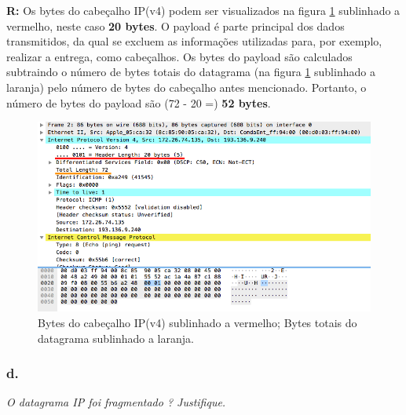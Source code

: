 \documentclass{llncs}
\begin{document}
\textbf{R:} Os bytes do cabeçalho IP(v4) podem ser visualizados na figura \ref{fig:2_c} sublinhado a vermelho, neste caso \textbf{20 bytes}. O payload é parte principal dos dados transmitidos, da qual se excluem as informações utilizadas para, por exemplo, realizar a entrega, como cabeçalhos. Os bytes do payload são calculados subtraindo o número de bytes totais do datagrama (na figura \ref{fig:2_c} sublinhado a laranja) pelo número de bytes do cabeçalho antes mencionado. Portanto, o número de bytes do payload são (72 - 20 =) \textbf{52 bytes}.

\begin{figure}[H]
\begin{center}
\includegraphics[scale=0.45]{2_c.png} 
\end{center}
\caption{\label{fig:2_c}Bytes do cabeçalho IP(v4) sublinhado a vermelho; Bytes totais do datagrama sublinhado a laranja.}
\end{figure}

\subsubsection{d.}
\emph{O
datagrama
IP
foi 
fragmentado
?
Justifique.}
\end{document}
